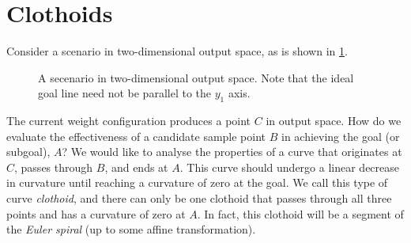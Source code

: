 \section{Clothoids}
Consider a scenario in two-dimensional output space, as is shown in \ref{fig:clothoid_motivation_scenario}.
\begin{figure}
    \centering
    \caption{A secenario in two-dimensional output space. Note that the ideal goal line need not be parallel to the $y_1$ axis.}
    \label{fig:clothoid_motivation_scenario}
\end{figure}
The current weight configuration produces a point $C$ in output space. 
How do we evaluate the effectiveness of a candidate sample point $B$ in achieving the goal (or subgoal), $A$?
We would like to analyse the properties of a curve that originates at $C$, passes through $B$, and ends at $A$.
This curve should undergo a linear decrease in curvature until reaching a curvature of zero at the goal.
We call this type of curve \textit{clothoid}, and there can only be one clothoid that passes through all three points and has a curvature of zero at $A$.
In fact, this clothoid will be a segment of the \textit{Euler spiral} (up to some affine transformation).

